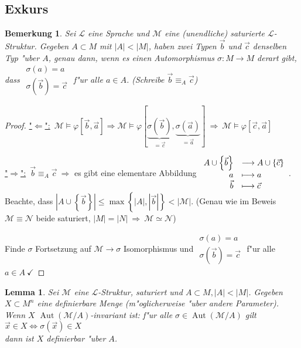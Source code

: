 \documentclass[a4paper,12pt,numbers=noenddot,parskip=full]{scrartcl}
\newcommand{\scrL}{\mathcal{L}}
\newcommand{\scrM}{\mathcal{M}}
\newcommand{\scrN}{\mathcal{N}}
\newcommand{\hin}{\underline{"$\Rightarrow$":}~}
\newcommand{\rueck}{\underline{"$\Leftarrow$":}~}
\DeclareMathOperator{\au}{Aut}
\theoremstyle{dotless}
\newtheorem{lemma}[theorem]{Lemma}
\newtheorem{remark}[theorem]{Bemerkung}
\begin{document}
\subsection{Exkurs}
\begin{remark}
	Sei $\scrL$ eine Sprache und $\scrM$ eine (unendliche) saturierte $\scrL$-Struktur. Gegeben $A \subset M$ mit $|A|<|M|$, haben zwei Typen $\vec{b}$ und $\vec{c}$ denselben Typ "uber $A$, genau dann, wenn es einen Automorphismus $\sigma: M \longrightarrow M$ derart gibt, dass $\begin{array}{c}
		\sigma(a) = a\\
		\sigma(\vec{b}) = \vec{c}
	\end{array}$ f"ur alle $a \in A$. (Schreibe $\vec{b} \equiv_A \vec{c}$)
\end{remark}
\begin{proof}
	\rueck $\scrM \models \varphi\left[\vec{b}, \vec{a}\right] \Rightarrow \scrM \models \varphi\left[\underbrace{\sigma(\vec{b})}_{= \vec{c}}, \underbrace{\sigma(\vec{a})}_{= \vec{a}}\right]~\Rightarrow~ \scrM \models \varphi\left[\vec{c}, \vec{a}\right]$
	
	\hin $\vec{b} \equiv_A \vec{c}~ \Rightarrow$ es gibt eine elementare Abbildung $\begin{array}{r l}
		A \cup \left\{\vec{b} \right\} &\longrightarrow A \cup \left\{\vec{c}\right\}\\
		a &\longmapsto a\\
		\vec{b} &\longmapsto \vec{c}
	\end{array}$. Beachte, dass $|A \cup \left\{\vec{b}\right\}| \leq \max \left\{|A|,|\vec{b}| \right\} < |\scrM|$.
	(Genau wie im Beweis $\scrM \equiv \scrN$ beide saturiert, $|M|=|N|~\Rightarrow~ \scrM \simeq \scrN$)
	
	Finde $\sigma$ Fortsetzung auf $\scrM \longrightarrow \sigma$ Isomorphismus und $\begin{array}{c}
		\sigma(a) = a\\
		\sigma\left(\vec{b}\right)=\vec{c}
	\end{array}$ f"ur alle $a \in A~ \checkmark$
\end{proof}
\begin{lemma}
	Sei $\scrM$ eine $\scrL$-Struktur, saturiert und $A \subset M, |A|<|M|$. Gegeben $X \subset M^n$ eine \emph{definierbare} Menge (m"oglicherweise "uber andere Parameter). Wenn $X$ $\au(\scrM/A)$-invariant ist: f"ur alle $\sigma \in \au(\scrM/A)$ gilt $\vec{x} \in X \Leftrightarrow \sigma(\vec{x}) \in X$\\
	dann ist $X$ definierbar "uber $A$.
\end{lemma}
\end{document}
